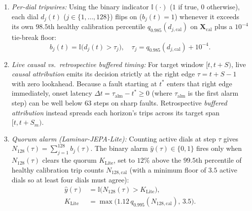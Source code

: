 \begin{enumerate}[leftmargin=*,nosep,itemsep=1pt]
    \item \emph{Per-dial tripwires:} Using the binary indicator $\mathbb{I}(\cdot)$ ($1$ if true, $0$ otherwise), each dial $d_j(t)$ ($j \in \{1,\dots,128\}$) flips on ($b_j(t)=1$) whenever it exceeds its own $98.5$th healthy calibration percentile $q_{0.985}(d_{j,\text{cal}})$ on $\mathbf{X}_{\text{cal}}$ plus a $10^{-4}$ tie-break floor:
    \begin{equation}
        b_j(t) = \mathbb{I}\bigl(d_j(t) > \tau_j\bigr), \quad \tau_j = q_{0.985}(d_{j,\text{cal}}) + 10^{-4}.
        \label{eq:dial_tripwire}
    \end{equation}
    \item \emph{Live causal vs.\ retrospective buffered timing:} For target window $[t, t+S)$, live \emph{causal attribution} emits its decision strictly at the right edge $\tau = t+S-1$ with zero lookahead. Because a fault starting at $t^*$ enters that right edge immediately, onset latency $\Delta t = \tau_{\text{alm}} - t^* \ge 0$ (where $\tau_{\text{alm}}$ is the first alarm step) can be well below $63$ steps on sharp faults. Retrospective \emph{buffered attribution} instead spreads each horizon's trips across its target span $[t, t+S_m)$.
    \item \emph{Quorum alarm (\emph{Laminar-JEPA-Lite}):} Counting active dials at step $\tau$ gives $N_{128}(\tau) = \sum_{j=1}^{128} b_j(\tau)$. The binary alarm $\hat{y}(\tau)\in\{0,1\}$ fires only when $N_{128}(\tau)$ clears the quorum $K_{\text{Lite}}$, set to $12\%$ above the $99.5$th percentile of healthy calibration trip counts $N_{128,\text{cal}}$ (with a minimum floor of $3.5$ active dials so at least four dials must agree):
    \begin{equation}
    \begin{aligned}
        \hat{y}(\tau) &= \mathbb{I}\bigl(N_{128}(\tau) > K_{\text{Lite}}\bigr), \\
        K_{\text{Lite}} &= \max\bigl(1.12\,q_{0.995}(N_{128,\text{cal}}),\,3.5\bigr).
    \end{aligned}
        \label{eq:panel_quorum}
    \end{equation}
\end{enumerate}

